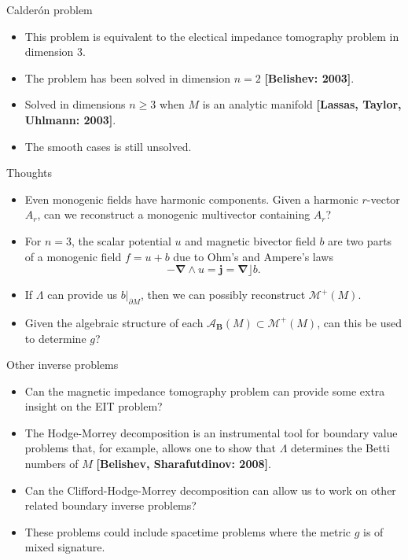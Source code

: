 \documentclass[aspectratio=169]{beamer}
\newcommand\boldgold[1]{\textcolor{csu_gold}{\textbf{#1}}}
\newcommand{\algebra}{\mathcal{A}}
\newcommand{\grad}{\boldsymbol{\nabla}}
\newcommand{\monogenics}{\mathcal{M}}
\newcommand{\blade}[1]{\boldsymbol{#1}}
\newcommand{\boundary}{{\partial M}}
\newcommand{\bivector}{\blade{B}}
\begin{document}
\begin{frame}{Calder\'on problem}
\vfill
\begin{itemize}
\pause
    \item This problem is equivalent to the electical impedance tomography problem in dimension 3. 
\pause
    \item The problem has been solved in dimension $n=2$ \boldgold{[Belishev: 2003]}.
\pause
    \item Solved in dimensions $n\geq 3$ when $M$ is an analytic manifold \boldgold{[Lassas, Taylor, Uhlmann: 2003]}. 
\pause
\item The smooth cases is still unsolved.
\end{itemize}
\vfill
\end{frame}

\begin{frame}{Thoughts}
\vfill
\begin{itemize}
\pause
\item Even monogenic fields have harmonic components. Given a harmonic $r$-vector $A_{r}$, can we reconstruct a monogenic multivector containing $A_r$?
\pause
\item For $n=3$, the scalar potential $u$ and magnetic bivector field $b$ are two parts of a monogenic field $f=u+b$ due to Ohm's and Ampere's laws 
\[
-\grad \wedge u = \blade{j}= \grad \rfloor b.
\] 
\vspace*{-0.25cm}
\pause
\item If $\Lambda$ can provide us $b\vert_\boundary$, then we can possibly reconstruct $\monogenics^+(M)$.
\pause
\item Given the algebraic structure of each $\algebra_{\bivector}(M) \subset \monogenics^+(M)$, can this be used to determine $g$?
\end{itemize}
\vfill
\end{frame}

\begin{frame}{Other inverse problems}
\vfill
\begin{itemize}
\pause
    \item Can the magnetic impedance tomography problem can provide some extra insight on the EIT problem?
\pause
    \item The Hodge-Morrey decomposition is an instrumental tool for boundary value problems that, for example, allows one to show that
 $\Lambda$ determines the Betti numbers of $M$ \boldgold{[Belishev, Sharafutdinov: 2008]}.
\pause
    \item Can the Clifford-Hodge-Morrey decomposition can allow us to work on other related boundary inverse problems? 
\pause
    \item These problems could include spacetime problems where the metric $g$ is of mixed signature.
\end{itemize}
\vfill
\end{frame}
\end{document}
